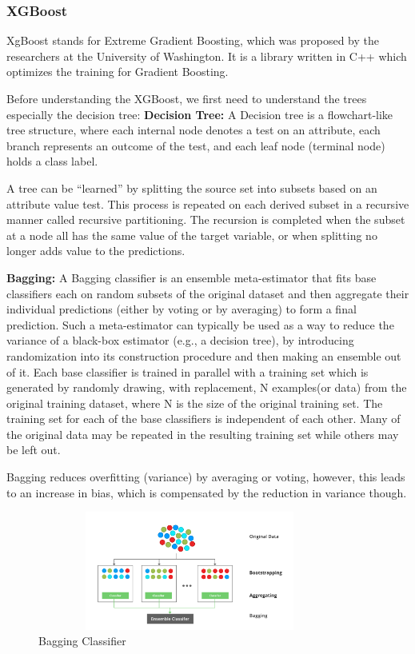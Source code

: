 \documentclass[12pt]{article}
\begin{document}
\subsubsection{XGBoost}
XgBoost stands for Extreme Gradient Boosting, which was proposed by the researchers at the University of Washington. It is a library written in C++ which optimizes the training for Gradient Boosting.

Before understanding the XGBoost, we first need to understand the trees especially the decision tree:
\textbf{Decision Tree:}
A Decision tree is a flowchart-like tree structure, where each internal node denotes a test on an attribute, each branch represents an outcome of the test, and each leaf node (terminal node) holds a class label. 

A tree can be “learned” by splitting the source set into subsets based on an attribute value test. This process is repeated on each derived subset in a recursive manner called recursive partitioning. The recursion is completed when the subset at a node all has the same value of the target variable, or when splitting no longer adds value to the predictions.

\textbf{Bagging:}
A Bagging classifier is an ensemble meta-estimator that fits base classifiers each on random subsets of the original dataset and then aggregate their individual predictions (either by voting or by averaging) to form a final prediction. Such a meta-estimator can typically be used as a way to reduce the variance of a black-box estimator (e.g., a decision tree), by introducing randomization into its construction procedure and then making an ensemble out of it.
Each base classifier is trained in parallel with a training set which is generated by randomly drawing, with replacement, N examples(or data) from the original training dataset, where N is the size of the original training set. The training set for each of the base classifiers is independent of each other. Many of the original data may be repeated in the resulting training set while others may be left out.

Bagging reduces overfitting (variance) by averaging or voting, however, this leads to an increase in bias, which is compensated by the reduction in variance though.

\begin{figure}[H]
\begin{center}
 \includegraphics[width=10cm, height=3.9cm]{Tech1}
\caption{Bagging Classifier}
\end{center}
\end{figure}
\end{document}
